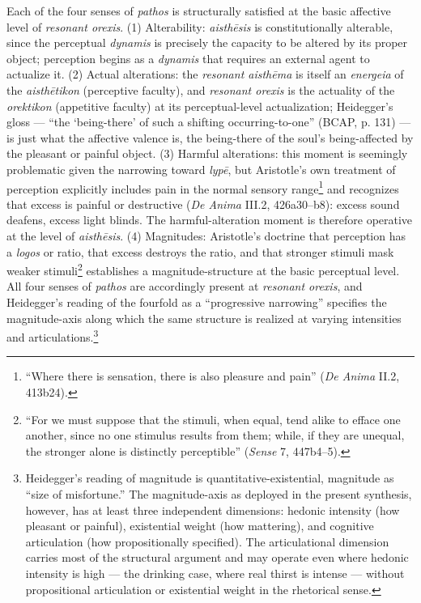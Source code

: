 Each of the four senses of \textit{pathos} is structurally satisfied at the basic affective level of \textit{resonant orexis}. (1) Alterability: \textit{aisthēsis} is constitutionally alterable, since the perceptual \textit{dynamis} is precisely the capacity to be altered by its proper object; perception begins as a \textit{dynamis} that requires an external agent to actualize it. (2) Actual alterations: the \textit{resonant aisthēma} is itself an \textit{energeia} of the \textit{aisthētikon} (perceptive faculty), and \textit{resonant orexis} is the actuality of the \textit{orektikon} (appetitive faculty) at its perceptual-level actualization; Heidegger's gloss --- ``the `being-there' of such a shifting occurring-to-one'' (BCAP, p. 131) --- is just what the affective valence is, the being-there of the soul's being-affected by the pleasant or painful object. (3) Harmful alterations: this moment is seemingly problematic given the narrowing toward \textit{lypē}, but Aristotle's own treatment of perception explicitly includes pain in the normal sensory range\footnote{``Where there is sensation, there is also pleasure and pain'' (\textit{De Anima} II.2, 413b24).} and recognizes that excess is painful or destructive (\textit{De Anima} III.2, 426a30--b8): excess sound deafens, excess light blinds. The harmful-alteration moment is therefore operative at the level of \textit{aisthēsis}. (4) Magnitudes: Aristotle's doctrine that perception has a \textit{logos} or ratio, that excess destroys the ratio, and that stronger stimuli mask weaker stimuli\footnote{``For we must suppose that the stimuli, when equal, tend alike to efface one another, since no one stimulus results from them; while, if they are unequal, the stronger alone is distinctly perceptible'' (\textit{Sense} 7, 447b4--5).} establishes a magnitude-structure at the basic perceptual level. All four senses of \textit{pathos} are accordingly present at \textit{resonant orexis}, and Heidegger's reading of the fourfold as a ``progressive narrowing'' specifies the magnitude-axis along which the same structure is realized at varying intensities and articulations.\footnote{Heidegger's reading of magnitude is quantitative-existential, magnitude as ``size of misfortune.'' The magnitude-axis as deployed in the present synthesis, however, has at least three independent dimensions: hedonic intensity (how pleasant or painful), existential weight (how mattering), and cognitive articulation (how propositionally specified). The articulational dimension carries most of the structural argument and may operate even where hedonic intensity is high --- the drinking case, where real thirst is intense --- without propositional articulation or existential weight in the rhetorical sense.}

